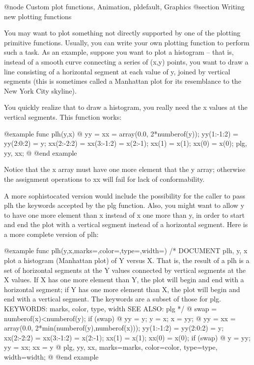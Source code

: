 @node Custom plot functions, Animation, pldefault, Graphics
@section Writing new plotting functions

You may want to plot something not directly supported by one of the
plotting primitive functions.  Usually, you can write your own
plotting function to perform such a task.  As an example, suppose you
want to plot a histogram -- that is, instead of a smooth curve
connecting a series of (x,y) points, you want to draw a line
consisting of a horizontal segment at each value of y, joined by
vertical segments (this is sometimes called a Manhattan plot for its
resemblance to the New York City skyline).

You quickly realize that to draw a histogram, you really need the x
values at the vertical segments.  This function works:

@example
func plh(y,x)
@{
  yy = xx = array(0.0, 2*numberof(y));
  yy(1:-1:2) = yy(2:0:2) = y;
  xx(2:-2:2) = xx(3:-1:2) = x(2:-1);
  xx(1) = x(1);
  xx(0) = x(0);
  plg, yy, xx;
@}
@end example

Notice that the x array must have one more element that the y array;
otherwise the assignment operations to xx will fail for lack of
conformability.

A more sophistocated version would include the possibility for the
caller to pass plh the keywords accepted by the plg function.  Also,
you might want to allow y to have one more element than x instead of x
one more than y, in order to start and end the plot with a vertical
segment instead of a horizontal segment.  Here is a more complete
version of plh:

@example
func plh(y,x,marks=,color=,type=,width=)
/* DOCUMENT plh, y, x
     plot a histogram (Manhattan plot) of Y versus X.  That is,
     the result of a plh is a set of horizontal segments at the Y
     values connected by vertical segments at the X values.  If X
     has one more element than Y, the plot will begin and end with
     a horizontal segment; if Y has one more element than X, the
     plot will begin and end with a vertical segment.  The keywords
     are a subset of those for plg.
   KEYWORDS: marks, color, type, width
   SEE ALSO: plg
 */
@{
  swap = numberof(x)<numberof(y);
  if (swap) @{ yy = y; y = x; x = yy; @}
  yy = xx = array(0.0, 2*min(numberof(y),numberof(x)));
  yy(1:-1:2) = yy(2:0:2) = y;
  xx(2:-2:2) = xx(3:-1:2) = x(2:-1);
  xx(1) = x(1);
  xx(0) = x(0);
  if (swap) @{ y = yy; yy = xx; xx = y @}
  plg, yy, xx, marks=marks, color=color, type=type, width=width;
@}
@end example

